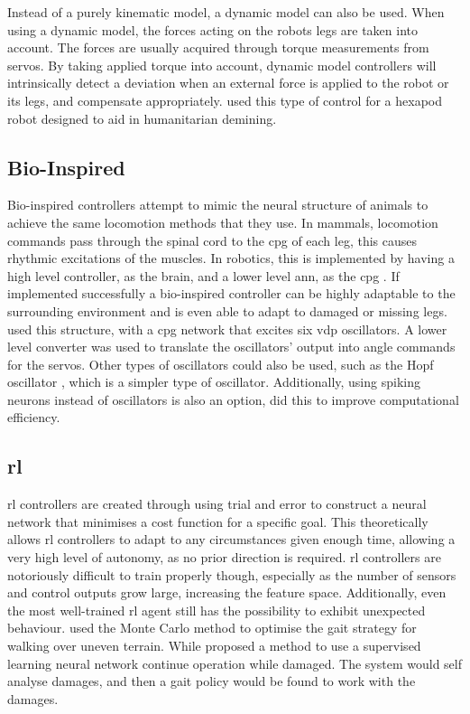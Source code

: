     Instead of a purely kinematic model, a dynamic model can also be used. When using a dynamic model, the forces acting on the robots legs are taken into account. The forces are usually acquired through torque measurements from servos. By taking applied torque into account, dynamic model controllers will intrinsically detect a deviation when an external force is applied to the robot or its legs, and compensate appropriately. \cite{Khudher2017} used this type of control for a hexapod robot designed to aid in humanitarian demining.
    
    \subsection{Bio-Inspired}
    Bio-inspired controllers attempt to mimic the neural structure of animals to achieve the same locomotion methods that they use. In mammals, locomotion commands pass through the spinal cord to the \ac{cpg} of each leg, this causes rhythmic excitations of the muscles. In robotics, this is implemented by having a high level controller, as the brain, and a lower level \ac{ann}, as the \ac{cpg} \citep{Guo2019}. If implemented successfully a bio-inspired controller can be highly adaptable to the surrounding environment and is even able to adapt to damaged or missing legs. \cite{Yu2013} used this structure, with a \ac{cpg} network that excites six \ac{vdp} oscillators. A lower level converter was used to translate the oscillators' output into angle commands for the servos. Other types of oscillators could also be used, such as the Hopf oscillator \citep{Chen2012}, which is a simpler type of oscillator. Additionally, using spiking neurons instead of oscillators is also an option, \citep{GUTIERREZGALAN202010} did this to improve computational efficiency.

    \newpage
    \subsection{\acf{rl}}
    \acf{rl} controllers are created through using trial and error to construct a neural network that minimises a cost function for a specific goal. This theoretically allows \ac{rl} controllers to adapt to any circumstances given enough time, allowing a very high level of autonomy, as no prior direction is required. \ac{rl} controllers are notoriously difficult to train properly though, especially as the number of sensors and control outputs grow large, increasing the feature space. Additionally, even the most well-trained \ac{rl} agent still has the possibility to exhibit unexpected behaviour. \cite{Liu2019} used the Monte Carlo method to optimise the gait strategy for walking over uneven terrain. While \cite{Verma2019DeepRL} proposed a method to use a supervised learning neural network continue operation while damaged. The system would self analyse damages, and then a gait policy would be found to work with the damages.
    
